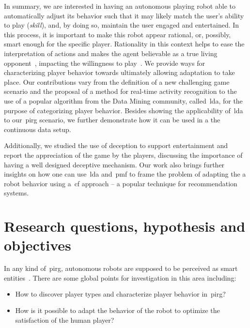 In summary, we are interested in having an autonomous playing robot able to automatically adjust its behavior such that it may likely match the user's ability to play (\textit{skill}), and, by doing so, maintain the user engaged and entertained. In this process, it is important to make this robot appear rational, or, possibly, smart enough for the specific player. Rationality in this context helps to ease the interpretation of actions and makes the agent believable as a true living opponent~\citep{lamberti_robotic_2018}, impacting the willingness to play~\citep{martinoia_physically_2013, bonarini_timing_2014}. 
We provide ways for characterizing player behavior towards ultimately allowing adaptation to take place. Our contributions vary from the definition of a new challenging game scenario and the proposal of a method for real-time activity recognition to the use of a popular algorithm from the Data Mining community, called~\acrfull{lda}, for the purpose of categorizing player behavior. Besides showing the applicability of~\gls{lda} to our~\gls{pirg} scenario, we further demonstrate how it can be used in a the continuous data setup.

Additionally, we studied the use of deception to support entertainment and report the appreciation of the game by the players, discussing the importance of having a well designed deceptive mechanism. Our work also brings further insights on how one can use~\gls{lda} and~\gls{pmf} to frame the problem of adapting the a robot behavior using a~\gls{cf} approach -- a popular technique for recommendation systems.



\section{Research questions, hypothesis and objectives}\label{sec:research_question}
In any kind of~\gls{pirg}, autonomous robots are supposed to be perceived as smart entities~\citep{martinoia_physically_2013, bonarini_timing_2014}. There are some global points for investigation in this area including:

\begin{itemize}
\item How to discover player types and characterize player behavior in~\gls{pirg}? 
\item How is it possible to adapt the behavior of the robot to optimize the satisfaction of the human player?

\end{itemize}

